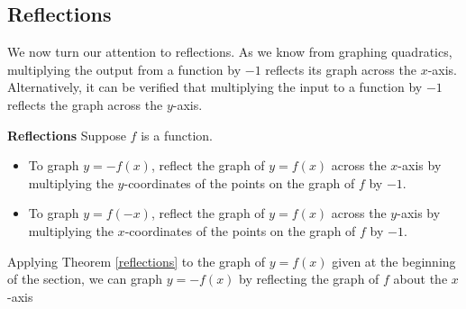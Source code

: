 \subsection{Reflections}

{}\pp

We now turn our attention to reflections. 
As we know from graphing quadratics,
 multiplying the output from a function by $-1$ reflects its graph across the $x$-axis.  Alternatively, it can be verified that multiplying the input to a function by $-1$ reflects the graph across the $y$-axis.

\smallskip

\bbm


\begin{thm} \label{reflections}\textbf{Reflections}  Suppose $f$ is a function. 

\begin{itemize}

\item To graph $y=-f(x)$, reflect the graph of $y=f(x)$ across the $x$-axis by multiplying the $y$-coordinates of the points on the graph of $f$ by $-1$.

\item To graph $y=f(-x)$, reflect the graph of $y=f(x)$ across the $y$-axis by multiplying the $x$-coordinates of the points on the graph of $f$ by $-1$.

\end{itemize}

\end{thm}

\ebm

\smallskip

Applying Theorem \ref{reflections} to the graph of $y=f(x)$ given at the beginning of the section, we can graph $y=-f(x)$ by reflecting the graph of $f$ about the $x$-axis

